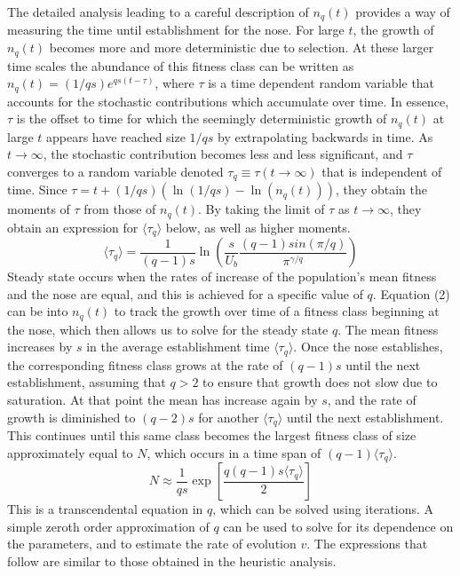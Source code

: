 \documentclass[12pt, one column]{article}
\begin{document}
The detailed analysis leading to a careful description of $n_q(t)$ provides a way of measuring the time until establishment for the nose.  For large $t$, the growth of $n_q(t)$ becomes more and more deterministic due to selection.  At these larger time scales the abundance of this fitness class can be written as $n_q(t) = (1/qs) e^{qs(t-\tau)}$, where $\tau$ is a time dependent random variable that accounts for the stochastic contributions which accumulate over time.  In essence, $\tau$ is the offset to time for which the seemingly deterministic growth of $n_q(t)$ at large $t$ appears have reached size $1/qs$ by extrapolating backwards in time.  As $t\rightarrow \infty$, the stochastic contribution becomes less and less significant, and $\tau$ converges to a random variable denoted $\tau_q \equiv \tau (t\rightarrow \infty)$ that is independent of time.  Since $\tau = t +(1/qs)(\ln(1/qs)-\ln(n_q(t)))$, they obtain the moments of $\tau$ from those of $n_q(t)$.  By taking the limit of $\tau$ as $t\rightarrow \infty$, they obtain an expression for $\langle \tau_q \rangle$ below, as well as higher moments. 
\begin{equation} 
\langle \tau_q \rangle = \frac{1}{(q-1)s}\ln\left(\frac{s}{U_b}\frac{(q-1)sin(\pi/q)}{\pi^{\gamma/q}}\right)
\end{equation}
Steady state occurs when the rates of increase of the population's mean fitness and the nose are equal, and this is achieved for a specific value of $q$.  Equation (2) can be into $n_q(t)$ to track the growth over time of a fitness class beginning at the nose, which then allows us to solve for the steady state $q$.  The mean fitness increases by $s$ in the average establishment time $\langle \tau_q \rangle$.  Once the nose establishes, the corresponding fitness class grows at the rate of $(q-1)s$ until the next establishment, assuming that $q>2$ to ensure that growth does not slow due to saturation.  At that point the mean has increase again by $s$, and the rate of growth is diminished to $(q-2)s$ for another $\langle \tau_q \rangle$ until the next establishment.  This continues until this same class becomes the largest fitness class of size approximately equal to $N$, which occurs in a time span of $(q-1) \langle \tau_q \rangle$.
\begin{equation}
N \approx  \frac{1}{qs} \exp\left[ \frac{q(q-1)s \langle \tau_q \rangle}{2}\right]  
\end{equation}
This is a transcendental equation in $q$, which can be solved using iterations.  A simple zeroth order approximation of $q$ can be used to solve for its dependence on the parameters, and to estimate the rate of evolution $v$. The expressions that follow are similar to those obtained in the heuristic analysis.
\end{document}
